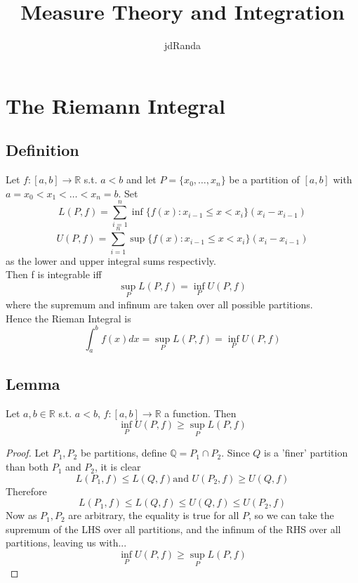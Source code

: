 \documentclass[a4paper, 12pt, twoside]{article}
\author{jdRanda}
\title{Measure Theory and Integration}
\begin{document}
\maketitle
\newpage

\section{The Riemann Integral}
\subsection{Definition}
Let $f:[a,b] \to  \mathbb{R}$ s.t. $a<b$ and let $P=\{x_{0},\dots,x_{n}\}$ be a partition of $[a,b]$ with $a=x_{0}<x_{1}<\dots<x_{n}=b$. Set
$$ L(P,f)= \sum_{i=1}^{n}\inf \{f(x):x_{i-1}\leq x < x_{i}\}(x_{i}-x_{i-1})$$
$$ U(P,f)= \sum_{i=1}^{n}\sup \{f(x):x_{i-1}\leq x < x_{i}\}(x_{i}-x_{i-1})$$
as the lower and upper integral sums respectivly. \\
Then f is integrable iff
$$ \sup_{P}L(P,f) = \inf_{P}U(P,f) $$
where the supremum and infinum are taken over all possible partitions.\\
Hence the Rieman Integral is
$$ \int_{a}^{b}f(x)dx=\sup_{P}L(P,f) = \inf_{P}U(P,f)$$
\subsection{Lemma}
Let $a,b\in \mathbb{R}$ s.t. $a<b$, $f:[a,b]\to \mathbb{R}$ a function. Then
$$ \inf_{P}U(P,f) \geq \sup_{P}L(P,f) $$
\begin{proof}
    Let $P_{1},P_{2}$ be partitions, define $\mathbb{Q}=P_{1} \cap P_{2}$. Since $Q$ is a 'finer' partition than both $P_{1}$ and $P_{2}$, it is clear
    $$ L(P_{1},f) \leq L(Q,f) \text{and } U(P_{2},f) \geq U(Q,f)$$
    Therefore
    $$ L(P_{1},f) \leq L(Q,f) \leq U(Q,f) \leq U(P_{2},f) $$
    Now as $P_{1},P_{2}$ are arbitrary, the equality is true for all $P$, so we can take the supremum of the LHS over all partitions, and the infinum of the RHS over all partitions, leaving us with...
    $$ \inf_{P}U(P,f) \geq \sup_{P}L(P,f)$$
\end{proof}
\end{document}
